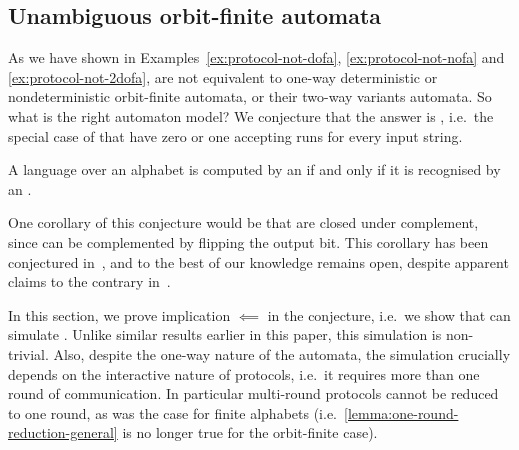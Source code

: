 \subsection{Unambiguous orbit-finite automata}
\label{sec:unambiguous-orbit-finite-automata}
\AP
As we have shown in Examples~\ref{ex:protocol-not-dofa},
\ref{ex:protocol-not-nofa} and \ref{ex:protocol-not-2dofa},
 are not equivalent to one-way deterministic or
nondeterministic orbit-finite automata, or their two-way variants automata. So
what is the right automaton model?  We conjecture that the answer is
, i.e.~the special case of
 that have zero or one accepting runs for
every input string.

\begin{conjecture}
    \label{conj:protocols-unambiguous}
    A language over an  alphabet is computed by 
    an  if and only if it is recognised by an .
\end{conjecture}

One corollary of this conjecture would be that  are closed under complement, since  can
be complemented by flipping the output bit. This corollary has been conjectured
in~\cite[p.9]{colcombet2012forms}, and to the best of our knowledge remains
open, despite apparent claims to the contrary in~\cite[Footnote
5]{colcombet2015unambiguity}.

In this section, we prove implication $\impliedby$ in the conjecture, i.e.~we
show that  can simulate . Unlike similar results earlier in this paper, this simulation is
non-trivial. Also, despite the one-way nature of the automata, the simulation
crucially depends on the interactive nature of protocols, i.e.~it requires more
than one round of communication. In particular multi-round protocols cannot be
reduced to one round, as was the case for finite alphabets
(i.e.~\cref{lemma:one-round-reduction-general} is no longer true for the
orbit-finite case).

